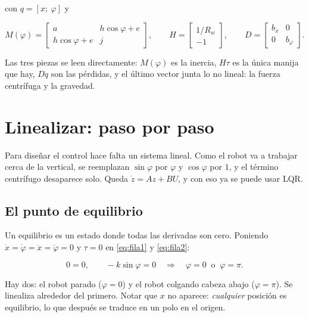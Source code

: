 \documentclass[11pt,a4paper]{report}
\begin{document}
con $q = [x;\ \varphi]$ y

\begin{equation}
M(\varphi) = \begin{bmatrix}
a & h\cos\varphi + e \\[2pt]
h\cos\varphi + e & j
\end{bmatrix},
\qquad
H = \begin{bmatrix} 1/R_w \\ -1 \end{bmatrix},
\qquad
D = \begin{bmatrix} b_x & 0 \\ 0 & b_\varphi \end{bmatrix}.
\end{equation}

Las tres piezas se leen directamente: $M(\varphi)$ es la inercia, $H\tau$ es la única manija
que hay, $D\dot q$ son las pérdidas, y el último vector junta lo no lineal: la fuerza
centrífuga y la gravedad.

\section{Linealizar: paso por paso}

\begin{idea}
Para diseñar el control hace falta un sistema lineal. Como el robot va a trabajar cerca de la
vertical, se reemplazan $\sin\varphi$ por $\varphi$ y $\cos\varphi$ por $1$, y el término
centrífugo desaparece solo. Queda $\dot z = Az + BU$, y con eso ya se puede usar LQR.
\end{idea}

\subsection{El punto de equilibrio}

Un equilibrio es un estado donde todas las derivadas son cero. Poniendo
$\dot x = \dot\varphi = \ddot x = \ddot\varphi = 0$ y $\tau = 0$ en \eqref{eq:fila1} y
\eqref{eq:fila2}:

\begin{equation}
0 = 0, \qquad -k\sin\varphi = 0 \quad\Longrightarrow\quad \varphi = 0 \ \text{ o } \ \varphi = \pi .
\end{equation}

Hay dos: el robot parado ($\varphi = 0$) y el robot colgando cabeza abajo ($\varphi = \pi$).
Se linealiza alrededor del primero. Notar que $x$ no aparece: \emph{cualquier} posición es
equilibrio, lo que después se traduce en un polo en el origen.
\end{document}
